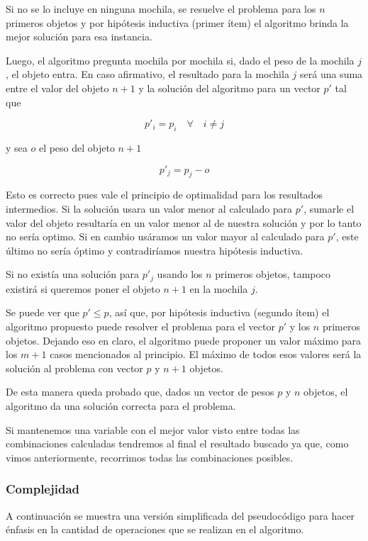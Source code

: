 Si no se lo incluye en ninguna mochila, se resuelve el problema para los $n$ primeros objetos y por hipótesis inductiva (primer ítem) el algoritmo brinda la mejor solución para esa instancia.

Luego, el algoritmo pregunta mochila por mochila si, dado el peso de la mochila $j$, el objeto entra. En caso afirmativo, el resultado para la mochila $j$ será una suma entre el valor del objeto $n + 1$ y la solución del algoritmo para un vector $p'$ tal que

$$p'_i = p_i \quad \forall \quad i \neq j$$

y sea $o$ el peso del objeto $n + 1$

$$p'_j = p_j - o$$

Esto es correcto pues vale el principio de optimalidad para los resultados intermedios. Si la solución usara un valor menor al calculado para $p'$, sumarle el valor del objeto resultaría en un valor menor al de nuestra solución y por lo tanto no sería optimo. Si en cambio usáramos un valor mayor al calculado para $p'$, este último no sería óptimo y contradiríamos nuestra hipótesis inductiva.

Si no existía una solución para $p'_j$ usando los $n$ primeros objetos, tampoco existirá si queremos poner el objeto $n+1$ en la mochila $j$.

Se puede ver que $p' \leq p$, así que, por hipótesis inductiva (segundo ítem) el algoritmo propuesto puede resolver el problema para el vector $p'$ y los $n$ primeros objetos. Dejando eso en claro, el algoritmo puede proponer un valor máximo para los $m + 1$ casos mencionados al principio. El máximo de todos esos valores será la solución al problema con vector $p$ y $n + 1$ objetos.

De esta manera queda probado que, dados un vector de pesos $p$ y $n$ objetos, el algoritmo da una solución correcta para el problema.

Si mantenemos una variable con el mejor valor visto entre todas las combinaciones calculadas tendremos al final el resultado buscado ya que, como vimos anteriormente, recorrimos todas las combinaciones posibles.

\QEDB

\subsubsection{Complejidad}

A continuación se muestra una versión simplificada del pseudocódigo para hacer énfasis en la cantidad de operaciones que se realizan en el algoritmo.

